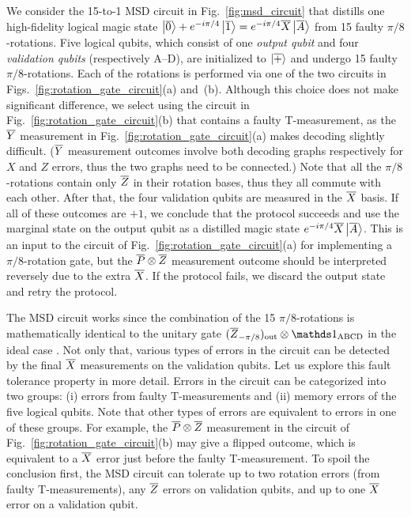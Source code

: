 \documentclass[
 prx,
 reprint,
 superscriptaddress,
 longbibliography,
 dvipsnames
]{revtex4-2}
\begin{document}
We consider the 15-to-1 MSD circuit in Fig.~\ref{fig:msd_circuit} that distills one high-fidelity logical magic state $\ket{\overline{0}} + e^{-i\pi/4}\ket{\overline{1}} = e^{-i\pi/4}\overline{X}\ket{\overline{A}}$ from 15 faulty $\pi/8$-rotations.
Five logical qubits, which consist of one \textit{output qubit} and four \textit{validation qubits} (respectively A--D), are initialized to $\ket{\overline{+}}$ and undergo 15 faulty $\pi/8$-rotations.
Each of the rotations is performed via one of the two circuits in Figs.~\ref{fig:rotation_gate_circuit}(a) and~(b).
Although this choice does not make significant difference, we select using the circuit in Fig.~\ref{fig:rotation_gate_circuit}(b) that contains a faulty T-measurement, as the $\overline{Y}$ measurement in Fig.~\ref{fig:rotation_gate_circuit}(a) makes decoding slightly difficult.
($\overline{Y}$ measurement outcomes involve both decoding graphs respectively for $X$ and $Z$ errors, thus the two graphs need to be connected.)
Note that all the $\pi/8$-rotations contain only $\overline{Z}$ in their rotation bases, thus they all commute with each other.
After that, the four validation qubits are measured in the $\overline{X}$ basis.
If all of these outcomes are $+1$, we conclude that the protocol succeeds and use the marginal state on the output qubit as a distilled magic state $e^{-i\pi/4}\overline{X}\ket{\overline{A}}$.
This is an input to the circuit of Fig.~\ref{fig:rotation_gate_circuit}(a) for implementing a $\pi/8$-rotation gate, but the $\overline{P} \otimes \overline{Z}$ measurement outcome should be interpreted reversely due to the extra $\overline{X}$.
If the protocol fails, we discard the output state and retry the protocol.

The MSD circuit works since the combination of the 15 $\pi/8$-rotations is mathematically identical to the unitary gate $(\rot{\lgz}{-\pi/8})_\mr{out} \otimes \identity_\mr{ABCD}$ in the ideal case \cite{litinski2019magic}.
Not only that, various types of errors in the circuit can be detected by the final $\overline{X}$ measurements on the validation qubits.
Let us explore this fault tolerance property in more detail.
Errors in the circuit can be categorized into two groups: (i) errors from faulty T-measurements and (ii) memory errors of the five logical qubits.
Note that other types of errors are equivalent to errors in one of these groups.
For example, the $\overline{P} \otimes \overline{Z}$ measurement in the circuit of Fig.~\ref{fig:rotation_gate_circuit}(b) may give a flipped outcome, which is equivalent to a $\overline{X}$ error just before the faulty T-measurement.
To spoil the conclusion first, the MSD circuit can tolerate up to two rotation errors (from faulty T-measurements), any $\overline{Z}$ errors on validation qubits, and up to one $\overline{X}$ error on a validation qubit.
\end{document}

